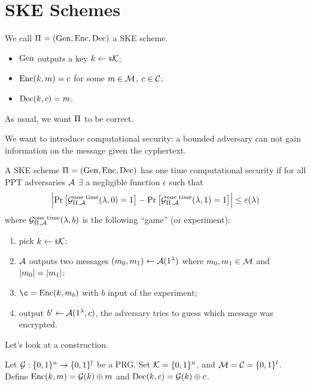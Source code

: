 
\chapter{\acl{SKE} Schemes}

\begin{definition}
	We call $\Pi_{} = \left( \mathrm{Gen} , \allowbreak \mathrm{Enc} , \allowbreak \mathrm{Dec} \right)$ a \ac{SKE} scheme.
	\begin{itemize}
		\item $\mathrm{Gen}$ outputs a key $k \leftarrow {\scriptstyle \$} {\mathcal{K}}$;
		\item $\mathrm{Enc}(k, m) = c$ for some $m \in \mathcal{M}$, $c \in \mathcal{C}$;
		\item $\mathrm{Dec}(k, c) = m$.
	\end{itemize}
	As usual, we want $\Pi_{}$ to be correct.
\end{definition}

We want to introduce computational security: a bounded adversary can not gain information on the message given the cyphertext.
\begin{definition}
	A \ac{SKE} scheme $\Pi_{} = \left( \mathrm{Gen} , \allowbreak \mathrm{Enc} , \allowbreak \mathrm{Dec} \right)$ has one time computational security if for all \ac{PPT} adversaries $\mathcal{A}$ $\exists$ a negligible function $\epsilon$ such that
	\begin{equation*}
		\left|{
			\mathop{\mathrm{Pr}}\limits_{} \left[ {\mathcal{G}^{\scriptstyle \text{one time}}_{\Pi_{}, \mathcal{A}}(\lambda, 0) = 1} \right]
			-
			\mathop{\mathrm{Pr}}\limits_{} \left[ {\mathcal{G}^{\scriptstyle \text{one time}}_{\Pi_{}, \mathcal{A}}(\lambda, 1) = 1} \right]
		}\right|
		\le \varepsilon(\lambda)
	\end{equation*}
	where $\mathcal{G}^{\scriptstyle \text{one time}}_{\Pi_{}, \mathcal{A}}(\lambda, b)$ is the following ``game'' (or experiment):
	\begin{enumerate}
		\item pick $k \leftarrow {\scriptstyle \$} {\mathcal{K}}$;
		\item $\mathcal{A}$ outputs two messages $(m_0, m_1) \leftarrow \mathcal{A}(1^{\lambda})$ where $m_0, m_1 \in \mathcal{M}$ and $\left|{m_0}\right| = \left|{m_1}\right|$;
		\item $\c = \SKEEnc(k, m_b)$ with $b$ input of the experiment;
		\item output $b' \leftarrow \mathcal{A}(1^{\lambda}, c)$, \ie the adversary tries to guess which message was encrypted. \qedhere
	\end{enumerate}
\end{definition}

Let's look at a construction.
\begin{construction} \label{cons:ske-prg}
	Let $\mathcal{G} : \{0,1\}^{n} \to \{0,1\}^{l}$ be a \ac{PRG}.
	Set $\mathcal{K} = \{0,1\}^{n}$, and $\mathcal{M} = \mathcal{C} = \{0,1\}^{l}$.
	Define $\mathrm{Enc}(k,m) = \mathcal{G}(k) \oplus m$ and $\mathrm{Dec}(k,c) = \mathcal{G}(k) \oplus c$.
\end{construction}

